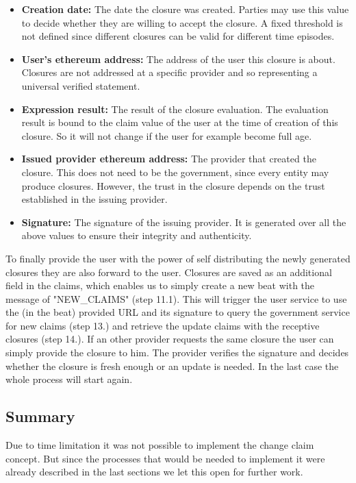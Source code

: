 \begin{itemize}
\item \textbf{Creation date:} The date the closure was created. Parties may use this value to decide whether they are willing to accept the closure. A fixed threshold is not defined since different closures can be valid for different time episodes. 
\item \textbf{User’s ethereum address:} The address of the user this closure is about. Closures are not addressed at a specific provider and so representing a universal verified statement. 
\item \textbf{Expression result:} The result of the closure evaluation. The evaluation result is bound to the claim value of the user at the time of creation of this closure. So it will not change if the user for example become full age. 
\item \textbf{Issued provider ethereum address:} The provider that created the closure. This does not need to be the government, since every entity may produce closures. However, the trust in the closure depends on the trust established in the issuing provider. 
\item \textbf{Signature:} The signature of the issuing provider. It is generated over all the above values to ensure their integrity and authenticity. 
\end{itemize} 

To finally provide the user with the power of self distributing the newly generated closures they are also forward to the user. Closures are saved as an additional field in the claims, which enables us to simply create a new beat with the message of "NEW\_CLAIMS" (step 11.1). This will trigger the user service to use the (in the beat) provided URL and its signature to query the government service for new claims (step 13.) and retrieve the update claims with the receptive closures (step 14.). If an other provider requests the same closure the user can simply provide the closure to him. The provider verifies the signature and decides whether the closure is fresh enough or an update is needed. In the last case the whole process will start again. 

\subsection{Summary}
\label{sec:coreSummary}
Due to time limitation it was not possible to implement the change claim concept. But since the processes that would be needed to implement it were already described in the last sections we let this open for further work. 

